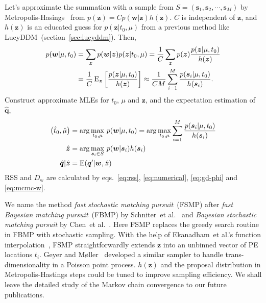 Let's approximate the summation with a sample from $S = (\bm{s}_1, \bm{s}_2, \cdots, \bm{s}_M)$ by Metropolis-Hasings~\cite{metropolis_equation_1953, hastings_monte_1970, mackay_information_2003} from $p(\bm{z}) = C p(\bm{w} | \bm{z}) h( \bm{z})$. $C$ is independent of $\bm{z}$, and $h(\bm{z})$ is an educated guess for $p(\bm{z}|t_0, \mu)$ from a previous method like LucyDDM~(section~\ref{sec:lucyddm}). Then,
\begin{equation}
  \label{eq:mh}
  \begin{aligned}
    p(\bm{w}|\mu, t_0) &= \sum_{\bm{z}} p(\bm{w}|\bm{z}) p(\bm{z}|t_0, \mu) = \frac{1}{C}\sum_{\bm{z}} p(\bm{z}) \frac{p(\bm{z} | \mu, t_0)}{h(\bm{z})} \\
    &= \frac{1}{C} \operatorname{E}_{\bm{z}}\left[ \frac{p(\bm{z} | \mu, t_0)}{h(\bm{z})} \right] \approx \frac{1}{CM} \sum_{i=1}^M \frac{p(\bm{s}_i | \mu, t_0)}{h(\bm{s}_i)}. \\
  \end{aligned}
\end{equation}
Construct approximate MLEs for $t_0$, $\mu$ and $\bm{z}$, and the expectation estimation of $\hat{\bm{q}}$,
\begin{equation}
  \label{eq:fsmpcharge}
  \begin{aligned}
    \left(\hat{t}_0, \hat{\mu}\right) &= \arg\underset{t_0,\mu}{\max}~p(\bm{w}|\mu, t_0) = \arg\underset{t_0,\mu}{\max} \sum_{i=1}^M \frac{p(\bm{s}_i | \mu, t_0)}{h(\bm{s}_i)}\\
    \hat{\bm{z}} &= \arg \underset{\bm{s}_i \in S}{\max}~p(\bm{w}|\bm{s}_i) h(\bm{s}_i) \\
    \hat{\bm{q}}|{\hat{\bm{z}}} &= \operatorname{E}(\bm{q}'|\bm{w},\hat{\bm{z}})
  \end{aligned}
\end{equation}
RSS and $D_\mathrm{w}$ are calculated by eqs.~\eqref{eq:rss}, \eqref{eq:numerical}, \eqref{eq:gd-phi} and \eqref{eq:mcmc-w}.

We name the method \emph{fast stochastic matching pursuit}~(FSMP) after \emph{fast Bayesian matching pursuit}~(FBMP) by Schniter~et al.~\cite{schniter_fast_2008} and \emph{Bayesian stochastic matching pursuit} by Chen~et al.~\cite{chen_stochastic_2011}.  Here FSMP replaces the greedy search routine in FBMP with stochastic sampling.  With the help of Ekanadham~et al.'s function interpolation~\cite{ekanadham_recovery_2011}, FSMP straightforwardly extends $\bm{z}$ into an unbinned vector of PE locations $t_i$.  Geyer and Møller~\cite{geyer_simulation_1994} developed a similar sampler to handle trans-dimensionality in a Poisson point process.  $h(\bm{z})$ and the proposal distribution in Metropolis-Hastings steps could be tuned to improve sampling efficiency.  We shall leave the detailed study of the Markov chain convergence to our future publications.

